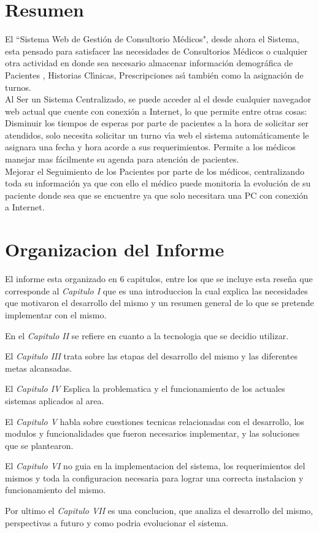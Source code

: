 \section{Resumen}

El ``Sistema Web de Gesti\'on de Consultorio M\'edicos", desde ahora el Sistema, esta pensado
para satisfacer las necesidades de Consultorios M\'edicos o cualquier otra actividad en donde
sea necesario almacenar informaci\'on demogr\'afica de Pacientes , Historias Cl\'{\i}nicas, 
Prescripciones as\'{\i} tambi\'en como la asignaci\'on de turnos.\\[0.1cm] 

Al Ser un Sistema Centralizado, se puede acceder al el desde cualquier navegador web actual 
que cuente con conexi\'on a Internet, lo que permite entre otras cosas:\\[0.1cm]

Disminuir los tiempos de esperas por parte de pacientes a la hora de solicitar ser atendidos, 
solo necesita solicitar un turno v\'{\i}a web el sistema autom\'aticamente le asignara una 
fecha y hora acorde a sus requerimientos. Permite a los m\'edicos manejar mas f\'acilmente su
agenda para atenci\'on de pacientes.\\[0.1cm]

Mejorar el Seguimiento de los Pacientes por parte de los m\'edicos, centralizando toda su 
informaci\'on ya que con ello el m\'edico puede monitoria la evoluci\'on de su paciente donde 
sea que se encuentre ya que solo necesitara una PC con conexi\'on a Internet.\\[0.1cm]


\section{Organizacion del Informe}

El informe esta organizado en 6 capitulos, entre los que se incluye esta reseña
que corresponde al \textit{Capitulo I} que es una introduccion la cual explica las necesidades 
que motivaron el desarrollo del mismo y un resumen general de lo que se pretende implementar 
con el mismo. 

En el \textit{Capitulo II} se refiere en cuanto a la tecnologia que 
se decidio utilizar. 

El \textit{Capitulo III} trata sobre las etapas del desarrollo del mismo y 
las diferentes metas alcansadas.

El \textit{Capitulo IV} Esplica la problematica y el funcionamiento
de los actuales sistemas aplicados al area. 

El \textit{Capitulo V} habla sobre cuestiones
tecnicas relacionadas con el desarrollo, los modulos y funcionalidades que fueron necesarios
implementar, y las soluciones que se plantearon.

El \textit{Capitulo VI} no guia en la implementacion del sistema, los requerimientos del 
mismos y toda la configuracion necesaria para lograr una correcta instalacion y 
funcionamiento del mismo.

Por ultimo el \textit{Capitulo VII} es una conclucion, que analiza el desarrollo del mismo, 
perspectivas a futuro y como podria evolucionar el sistema.
